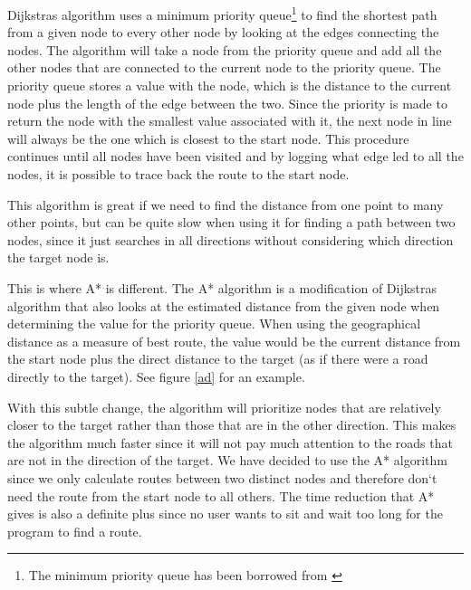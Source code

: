 Dijkstras algorithm uses a minimum priority queue\footnote{The minimum priority
queue has been borrowed from \cite{httpalgs4}} to find the shortest path from a
given node to every other node by looking at the edges connecting the nodes. The
algorithm will take a node from the priority queue and add all the other nodes
that are connected to the current node to the priority queue. The priority queue
stores a value with the node, which is the distance to the current node plus the
length of the edge between the two. Since the priority is made to return the
node with the smallest value associated with it, the next node in line will
always be the one which is closest to the start node. This procedure continues
until all nodes have been visited and by logging what edge led to all the nodes,
it is possible to trace back the route to the start node.

This algorithm is great if we need to find the distance from one point to many other
points, but can be quite slow when using it for finding a path between two
nodes, since it just searches in all directions without considering which
direction the target node is.

This is where A* is different. The A* algorithm is a modification of Dijkstras
algorithm that also looks at the estimated distance from the given node when
determining the value for the priority queue. When using the geographical distance
as a measure of best route, the value would be the current distance from the start
node plus the direct distance to the target (as if there were a road directly to
the target). See figure \ref{ad} for an example. 

With this subtle change, the algorithm will prioritize nodes that are
relatively closer to the target rather than those that are in the other
direction. This makes the algorithm much faster since it will not pay much attention
to the roads that are not in the direction of the target.
We have decided to use the A* algorithm since we only calculate routes between
two distinct nodes and therefore don`t need the route from the start node to all
others. The time reduction that A* gives is also a definite plus since no user
wants to sit and wait too long for the program to find a route.

